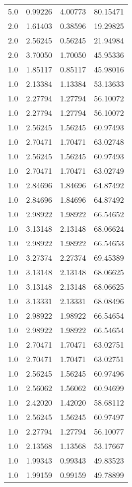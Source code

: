 \begin{longtable}{llll}
	5.0 & 0.99226 & 4.00773 & 80.15471 \\
	2.0 & 1.61403 & 0.38596 & 19.29825 \\
	2.0 & 2.56245 & 0.56245 & 21.94984 \\
	2.0 & 3.70050 & 1.70050 & 45.95336 \\
	1.0 & 1.85117 & 0.85117 & 45.98016 \\
	1.0 & 2.13384 & 1.13384 & 53.13633 \\
	1.0 & 2.27794 & 1.27794 & 56.10072 \\
	1.0 & 2.27794 & 1.27794 & 56.10072 \\
	1.0 & 2.56245 & 1.56245 & 60.97493 \\
	1.0 & 2.70471 & 1.70471 & 63.02748 \\
	1.0 & 2.56245 & 1.56245 & 60.97493 \\
	1.0 & 2.70471 & 1.70471 & 63.02749 \\
	1.0 & 2.84696 & 1.84696 & 64.87492 \\
	1.0 & 2.84696 & 1.84696 & 64.87492 \\
	1.0 & 2.98922 & 1.98922 & 66.54652 \\
	1.0 & 3.13148 & 2.13148 & 68.06624 \\
	1.0 & 2.98922 & 1.98922 & 66.54653 \\
	1.0 & 3.27374 & 2.27374 & 69.45389 \\
	1.0 & 3.13148 & 2.13148 & 68.06625 \\
	1.0 & 3.13148 & 2.13148 & 68.06625 \\
	1.0 & 3.13331 & 2.13331 & 68.08496 \\
	1.0 & 2.98922 & 1.98922 & 66.54654 \\
	1.0 & 2.98922 & 1.98922 & 66.54654 \\
	1.0 & 2.70471 & 1.70471 & 63.02751 \\
	1.0 & 2.70471 & 1.70471 & 63.02751 \\
	1.0 & 2.56245 & 1.56245 & 60.97496 \\
	1.0 & 2.56062 & 1.56062 & 60.94699 \\
	1.0 & 2.42020 & 1.42020 & 58.68112 \\
	1.0 & 2.56245 & 1.56245 & 60.97497 \\
	1.0 & 2.27794 & 1.27794 & 56.10077 \\
	1.0 & 2.13568 & 1.13568 & 53.17667 \\
	1.0 & 1.99343 & 0.99343 & 49.83523 \\
	1.0 & 1.99159 & 0.99159 & 49.78899 \\

\end{longtable}
